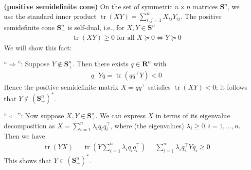 \documentclass{article}
\newcommand{\bfs}[1]{\textbf{({#1}) }}
\begin{document}
\begin{exma}{\bfs{positive semidefinite cone}}\label{exm:sem_con}
   On the set of symmetric $n \times n$ matrices $\mathbf{S}^{n}$, we use the standard inner product $\operatorname{tr}(X Y)=\sum_{i, j=1}^{n} X_{i j} Y_{i j}$. The positive semidefinite cone $\mathbf{S}_{+}^{n}$ is self-dual, i.e., for $X, Y \in \mathbf{S}^{n}$
\begin{align*}
\operatorname{tr}(X Y) \geq 0 \text { for all } X \succeq 0 \Longleftrightarrow Y \succeq 0
\end{align*}
We will show this fact:

``$\Rightarrow$'': Suppose $Y \notin \mathbf{S}_{+}^{n} .$ Then there exists $q \in \mathbf{R}^{n}$ with
\begin{align*}
q^{\top} Y q=\operatorname{tr}\left(q q^{\top} Y\right)<0
\end{align*}
Hence the positive semidefinite matrix $X=q q^{\top}$ satisfies $\operatorname{tr}(X Y)<0$; it follows that $Y \notin\left(\mathbf{S}_{+}^{n}\right)^{*}$.

``$\Leftarrow$'': Now suppose $X, Y \in \mathbf{S}_{+}^{n} .$ We can express $X$ in terms of its eigenvalue decomposition as $X=\sum_{i=1}^{n} \lambda_{i} q_{i} q_{i}^{\top}$, where (the eigenvalues) $\lambda_{i} \geq 0, i=1, \ldots, n$. Then we have
\begin{align*}
\operatorname{tr}(Y X)=\operatorname{tr}\left(Y \sum_{i=1}^{n} \lambda_{i} q_{i} q_{i}^{\top}\right)=\sum_{i=1}^{n} \lambda_{i} q_{i}^{\top} Y q_{i} \geq 0
\end{align*}
This shows that $Y \in\left(\mathbf{S}_{+}^{n}\right)^{*}$.
\end{exma}
\end{document}
